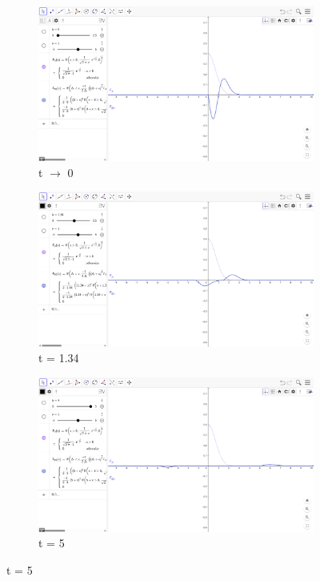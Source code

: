 \documentclass[a4paper,12pt]{article}
\begin{document}
\begin{figure}[H]
    \centering
    \begin{subfigure}[b]{0.45\textwidth}
         \centering
         \includegraphics[width=\textwidth]{fig/Fa0.png}
         \caption{t $\rightarrow$ 0}
         \label{fig:t0}
    \end{subfigure}
    \hfill
    \begin{subfigure}[b]{0.45\textwidth}
         \centering
         \includegraphics[width=\textwidth]{fig/Fa1.png}
         \caption{t = 1.34}
         \label{fig:t1}
    \end{subfigure}
    \hfill
    \begin{subfigure}[b]{0.6\textwidth}
         \centering
         \includegraphics[width=\textwidth]{fig/Fa2.png}
         \caption{t = 5}
         \label{fig:t2}
    \end{subfigure}
\end{figure}
\end{document}
